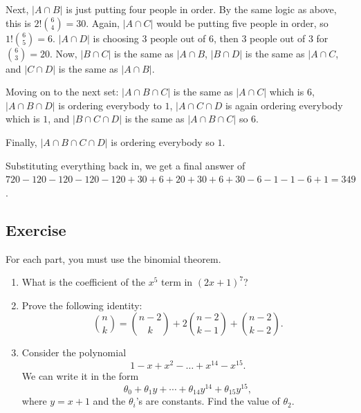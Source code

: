 \documentclass{article}
\newcounter{counter}
\newcommand{\Exercise}{Exercise \stepcounter{counter}\thecounter}
\begin{document}
\begin{enumerate}
        \vspace{1.5mm}
        \qquad Next, $|A \cap B|$ is just putting four people in order. By the same logic as above, this is $2!\binom{6}{4} = 30$. Again, $|A \cap C|$ would be putting five people in order, so $1!\binom{6}{5} = 6$. $|A \cap D|$ is choosing $3$ people out of $6$, then $3$ people out of $3$ for $\binom{6}{3} = 20$. Now, $|B \cap C|$ is the same as $|A \cap B$, $|B \cap D|$ is the same as $|A \cap C$, and $|C \cap D|$ is the same as $|A \cap B|$.
        
        \vspace{1.5mm} 
        \qquad Moving on to the next set: $|A \cap B \cap C|$ is the same as $|A \cap C|$ which is $6$, $|A \cap B \cap D|$ is ordering everybody to $1$, $|A \cap C \cap D$ is again ordering everybody which is $1$, and $|B \cap C \cap D|$ is the same as $|A \cap B \cap C|$ so $6$.
        
        \vspace{1.5mm}
        \qquad Finally, $|A \cap B \cap C \cap D|$ is ordering everybody so $1$.
        
        \vspace{1.5mm}
        Substituting everything back in, we get a final answer of $720 - 120 - 120 - 120 - 120 + 30 + 6 + 20 + 30 + 6 + 30 - 6 - 1 - 1 - 6 + 1 = 349$.
    \end{enumerate}

\subsection*{\Exercise}
    For each part, you must use the binomial theorem.
    \begin{enumerate}
        \item What is the coefficient of the $x^{5}$ term in $(2x + 1)^{7}$?
        \item Prove the following identity: $$\binom{n}{k} = \binom{n - 2}{k} + 2\binom{n-2}{k-1} + \binom{n-2}{k-2}.$$
        \item Consider the polynomial $$1 - x + x^2 - \dots + x^{14} - x^{15}.$$ We can write it in the form $$\theta_{0} + \theta_{1}y + \cdots + \theta_{14}y^{14} + \theta_{15}y^{15},$$ where $y = x + 1$ and the $\theta_{i}$'s are constants. Find the value of $\theta_{2}$.
    \end{enumerate}
\end{document}
